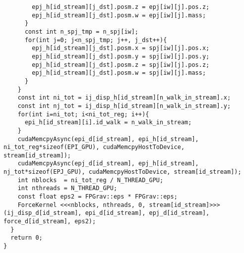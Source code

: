 \documentclass[10pt,onecolumn,a4paper,fleqn]{article}
\begin{document}
\begin{mdframed}[
    backgroundcolor=bg,
    topline=false,
    bottomline=false,
    leftline=false,
    rightline=false]
\begin{verbatim}
        epj_h[id_stream][j_dst].posm.z = epj[iw][j].pos.z;
        epj_h[id_stream][j_dst].posm.w = epj[iw][j].mass;
      }
      const int n_spj_tmp = n_spj[iw];
      for(int j=0; j<n_spj_tmp; j++, j_dst++){
        epj_h[id_stream][j_dst].posm.x = spj[iw][j].pos.x;
        epj_h[id_stream][j_dst].posm.y = spj[iw][j].pos.y;
        epj_h[id_stream][j_dst].posm.z = spj[iw][j].pos.z;
        epj_h[id_stream][j_dst].posm.w = spj[iw][j].mass;
      }
    }
    const int ni_tot = ij_disp_h[id_stream][n_walk_in_stream].x;
    const int nj_tot = ij_disp_h[id_stream][n_walk_in_stream].y;
    for(int i=ni_tot; i<ni_tot_reg; i++){
      epi_h[id_stream][i].id_walk = n_walk_in_stream;
    }
    cudaMemcpyAsync(epi_d[id_stream], epi_h[id_stream], ni_tot_reg*sizeof(EPI_GPU), cudaMemcpyHostToDevice, stream[id_stream]);
    cudaMemcpyAsync(epj_d[id_stream], epj_h[id_stream], nj_tot*sizeof(EPJ_GPU), cudaMemcpyHostToDevice, stream[id_stream]);
    int nblocks  = ni_tot_reg / N_THREAD_GPU;
    int nthreads = N_THREAD_GPU;
    const float eps2 = FPGrav::eps * FPGrav::eps;
    ForceKernel <<<nblocks, nthreads, 0, stream[id_stream]>>> (ij_disp_d[id_stream], epi_d[id_stream], epj_d[id_stream], force_d[id_stream], eps2);
  }
  return 0;
}
  \end{verbatim}
\end{mdframed}

\end{document}
